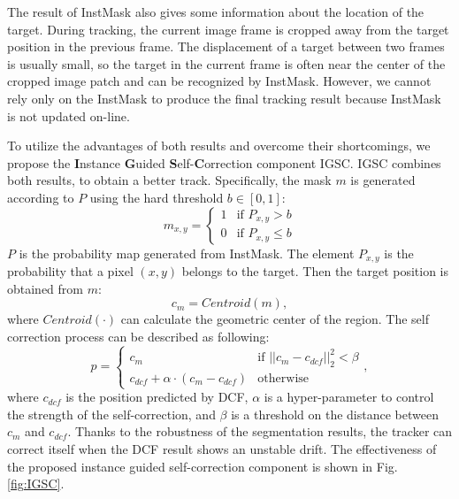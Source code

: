\documentclass[review]{elsarticle}
\begin{document}
\begin{CJK*}{UTF8}{gbsn}
The result of InstMask also gives some information about the location of the target. During tracking, the current image frame is cropped away from the target position in the previous frame. The displacement of a target between two frames is usually small, so the target in the current frame is often near the center of the cropped image patch and can be recognized by InstMask. However, we cannot rely only on the InstMask to produce the final tracking result because InstMask is not updated on-line.

To utilize the advantages of both results and overcome their shortcomings, we propose the \textbf{I}nstance \textbf{G}uided \textbf{S}elf-\textbf{C}orrection component IGSC. IGSC combines both results, to obtain a better track. Specifically, the mask $m$ is generated according to $P$ using the hard threshold $b \in [0, 1] $:
\begin{equation}
m_{x,y} = \left\{ \begin{array}{ll}
 1 & \textrm{if $P_{x,y} > b$}\\
 0 & \textrm{if $P_{x,y} \le b$}
 \end{array} \right.
\end{equation}
$P$ is the probability map generated from InstMask. The element $P_{x,y}$ is the probability that a pixel $(x,y)$ belongs to the target.
Then the target position is obtained from $m$:
\begin{equation}
c_{m} = Centroid(m),
\end{equation}
where $Centroid(\mathord{\cdot})$ can calculate the geometric center of the region.
The self correction process can be described as following:
\begin{equation}
p = \left\{ \begin{array}{ll}
 c_{m} & \textrm{if $||c_{m}-c_{dcf}||_2^2 < \beta$}\\
 c_{dcf} + \alpha \cdot (c_{m}-c_{dcf}) & \textrm{otherwise}
 \end{array} \right.,
\end{equation}
where $c_{dcf}$ is the position predicted by DCF, $\alpha$ is a hyper-parameter to control the strength of the self-correction, and $\beta$ is a threshold on the distance between $c_{m}$ and $c_{dcf}$.
Thanks to the robustness of the segmentation results, the tracker can correct itself when the DCF result shows an unstable drift. The effectiveness of the proposed instance guided self-correction component is shown in Fig. \ref{fig:IGSC}.


\end{CJK*}
\end{document}
